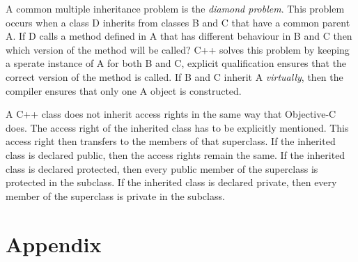 \documentclass[12pt, a4paper, twocolumn]{article}
\begin{document}
A common multiple inheritance problem is the \textit{diamond problem}. This problem occurs when a class D inherits from classes B and C that have a common parent A. If D calls a method defined in A that has different behaviour in B and C then which version of the method will be called? C++ solves this problem by keeping a sperate instance of A for both B and C, explicit qualification ensures that the correct version of the method is called. If B and C inherit A \textit{virtually}, then the compiler ensures that only one A object is constructed.

A C++ class does not inherit access rights in the same way that Objective-C does. The access right of the inherited class has to be explicitly mentioned. This access right then transfers to the members of that superclass. If the inherited class is declared public, then the access rights remain the same. If the inherited class is declared protected, then every public member of the superclass is protected in the subclass. If the inherited class is declared private, then every member of the superclass is private in the subclass.







\printbibliography[heading = bibnumbered]

\section{Appendix}

\end{document}
